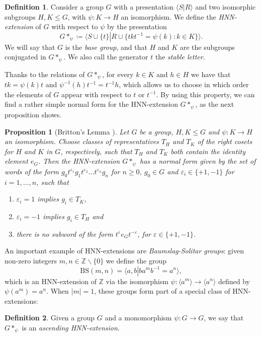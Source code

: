 \documentclass[letterpaper,11pt,reqno]{amsart}
\theoremstyle{plain}
\newtheorem{proposition}[theorem]{Proposition}
\theoremstyle{definition}
\newtheorem{definition}{Definition}[section]
\theoremstyle{cupremark}
\begin{document}
\begin{definition}\label{definition.hnn_extension} Consider a group $G$ with a presentation $\langle S\left|\right. R\rangle$ and two isomorphic subgroups $H,K\le G$, with $\psi:K\to H$ an isomorphism. We define the \textit{HNN-extension} of $G$ with respect to $\psi$ by the presentation
	$$
	G*_{\psi}\coloneqq \langle S\cup\{t\} \left|\right. R\cup \{t k t^{-1}=\psi(k): k\in K \} \rangle.
	$$
	We will say that $G$ is the \textit{base group}, and that $H$ and $K$ are the subgroups conjugated in $G*_{\psi}$. We also call the generator $t$ the \textit{stable letter}.
\end{definition}
Thanks to the relations of $G*_{\psi}$, for every $k\in K$ and $h\in H$ we have that $tk=\psi(k)t$ and $\psi^{-1}(h)t^{-1}=t^{-1}h$, which allows us to choose in which order the elements of $G$ appear with respect to $t$ or $t^{-1}$. By using this property, we can find a rather simple normal form for the HNN-extension $G*_{\psi}$, as the next proposition shows.

\begin{proposition}[Britton's Lemma {\cite[Theorem~IV.2.1]{lyndon_schupp_1977}}] \label{prop:hnn_general_normal_form}Let $G$ be a group, $H,K\le G$ and $\psi:K\to H$ an isomorphism. 
	Choose classes of representatives $T_H$ and $T_K$ of the right cosets for $H$ and $K$ in $G$, respectively, such that $T_H$ and $T_K$ both contain the identity element $e_G$. Then the HNN-extension $G*_\psi$ has a normal form given by the set of words of the form $g_0t^{\varepsilon_1}g_1t^{\varepsilon_2}\ldots t^{\varepsilon_n}g_n$ for $n\ge 0$, $g_0\in G$ and $\varepsilon_i\in \{+1,-1\}$ for $i=1,\ldots,n$, such that
	\begin{enumerate}
		\item $\varepsilon_i=1 $ implies $g_i\in T_K$,
		\item $\varepsilon_i=-1$ implies $g_i\in T_H$ and 
		\item there is no subword of the form $t^\varepsilon e_G t^{-\varepsilon}$, for $\varepsilon\in\{+1,-1\}$.
	\end{enumerate} 
\end{proposition}

An important example of HNN-extensions are \textit{Baumslag-Solitar groups}: given non-zero integers $m,n\in \mathbb{Z}\backslash\{0\}$ we define the group 
$$\mathrm{BS}(m,n)=\langle a,b \left|\right. ba^mb^{-1}=a^n\rangle,$$ 
which is an HNN-extension of $\mathbb{Z}$ via the isomorphism $\psi:\langle a^m \rangle\to \langle a^n\rangle$ defined by $\psi(a^m)=a^n$. When $|m|=1$, these groups form part of a special class of HNN-extensions:
\begin{definition}\label{def:ascending hnn extension} Given a group $G$ and a monomorphism $\psi:G\to G$, we say that $G*_{\psi}$ is an \textit{ascending HNN-extension}.
\end{definition}
\end{document}

